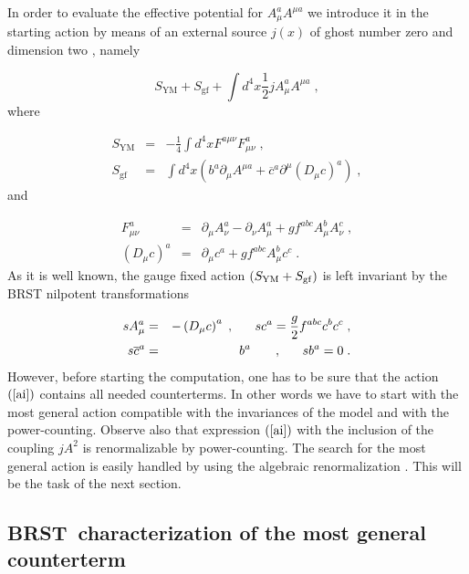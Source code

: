 \documentclass[a4paper,12pt]{article}
\begin{document}
In order to evaluate the effective potential for $A_{\mu }^{a}A^{\mu a}$ we
introduce it in the starting action by means of an external source $j(x)$ of
ghost number zero and dimension two \cite{v1}, namely

\begin{equation}
S_{\mathrm{YM}}+S_{\mathrm{gf}}+\int d^{4}x\frac{1}{2}jA_{\mu }^{a}A^{\mu
a}\;,  \label{ai}
\end{equation}
where

\begin{eqnarray}
S_{\mathrm{YM}} &=&-\frac{1}{4}\int d^{4}xF^{a\mu \nu }F_{\mu \nu }^{a}\;,
\label{sym} \\
S_{\mathrm{gf}} &=&\int d^{4}x\left( b^{a}\partial _{\mu }A^{\mu a}+%
\overline{c}^{a}\partial ^{\mu }\left( D_{\mu }c\right) ^{a}\right) \;, 
\nonumber
\end{eqnarray}
and

\begin{eqnarray}
F_{\mu \nu }^{a} &=&\partial _{\mu }A_{\nu }^{a}-\partial _{\nu }A_{\mu
}^{a}+gf^{abc}A_{\mu }^{b}A_{\nu }^{c}\;,  \label{f} \\
\left( D_{\mu }c\right) ^{a} &=&\partial _{\mu }c^{a}+gf^{abc}A_{\mu
}^{b}c^{c}\;.  \nonumber
\end{eqnarray}
As it is well known, the gauge fixed action $\left( S_{\mathrm{YM}}+S_{%
\mathrm{gf}}\right) $ is left invariant by the BRST nilpotent transformations

\begin{eqnarray}
sA_{\mu }^{a} &=&-\left( D_{\mu }c\right) ^{a}\;,\;\;\;\;\;\;sc^{a}=\frac{g}{%
2}f^{abc}c^{b}c^{c}\;,  \label{brst} \\
s\overline{c}^{a} &=&b^{a}\;\;\;\;\;\;\;,\;\;\;\;\;\;sb^{a}=0\;.  \nonumber
\end{eqnarray}
However, before starting the computation, one has to be sure that the action 
$\left( \ref{ai}\right) $ contains all needed counterterms. In other words
we have to start with the most general action compatible with the
invariances of the model and with the power-counting. Observe also that
expression $\left( \ref{ai}\right) $ with the inclusion of the coupling $%
jA^{2}$ is renormalizable by power-counting. The search for the most general
action is easily handled by using the algebraic renormalization \cite{book}.
This will be the task of the next section.

\subsection{BRST\ characterization of the most general counterterm}
\end{document}
